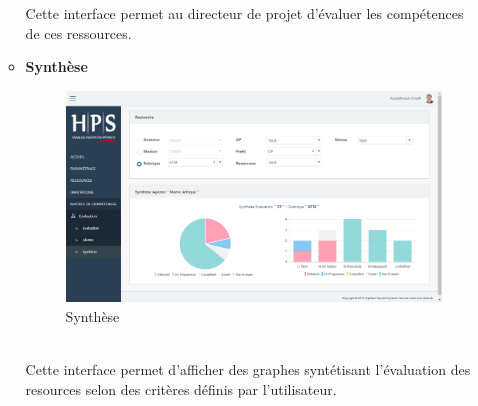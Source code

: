 \begin{itemize}[label=\textbullet]
\begin{itemize}
\newpage
Cette interface permet au directeur de projet d'évaluer les compétences de ces ressources.
\item \textbf{Synthèse}
\begin{figure}[h!]  
			\centering
			\includegraphics[width=1\textwidth]{chapitre5/Figures/synthese.png}
			\caption{Synthèse}
			\end{figure}
\\
Cette interface permet d'afficher des graphes syntétisant l'évaluation des resources selon des critères définis par l'utilisateur.
\end{itemize}
\end{itemize}